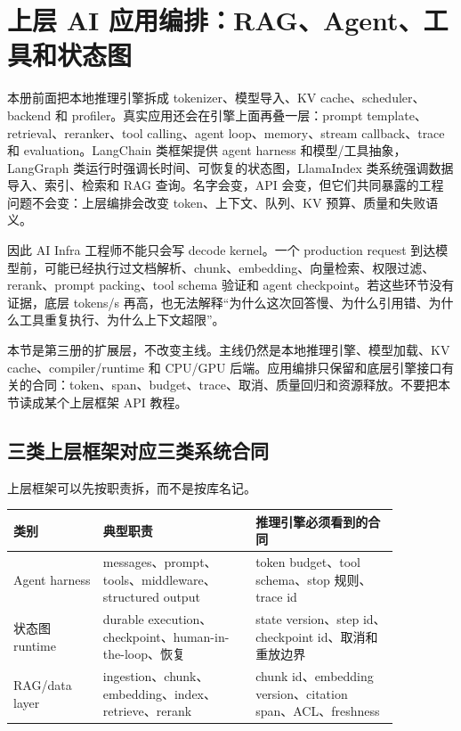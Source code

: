 \section{上层 AI 应用编排：RAG、Agent、工具和状态图}

本册前面把本地推理引擎拆成 tokenizer、模型导入、KV cache、scheduler、backend 和 profiler。真实应用还会在引擎上面再叠一层：prompt template、retrieval、reranker、tool calling、agent loop、memory、stream callback、trace 和 evaluation。LangChain 类框架提供 agent harness 和模型/工具抽象，LangGraph 类运行时强调长时间、可恢复的状态图，LlamaIndex 类系统强调数据导入、索引、检索和 RAG 查询。名字会变，API 会变，但它们共同暴露的工程问题不会变：上层编排会改变 token、上下文、队列、KV 预算、质量和失败语义。

因此 AI Infra 工程师不能只会写 decode kernel。一个 production request 到达模型前，可能已经执行过文档解析、chunk、embedding、向量检索、权限过滤、rerank、prompt packing、tool schema 验证和 agent checkpoint。若这些环节没有证据，底层 tokens/s 再高，也无法解释“为什么这次回答慢、为什么引用错、为什么工具重复执行、为什么上下文超限”。

\begin{warningbox}
本节是第三册的扩展层，不改变主线。主线仍然是本地推理引擎、模型加载、KV cache、compiler/runtime 和 CPU/GPU 后端。应用编排只保留和底层引擎接口有关的合同：token、span、budget、trace、取消、质量回归和资源释放。不要把本节读成某个上层框架 API 教程。
\end{warningbox}

\subsection{三类上层框架对应三类系统合同}

上层框架可以先按职责拆，而不是按库名记。

\begin{center}
\small
\begin{tabular}{p{0.20\linewidth}p{0.34\linewidth}p{0.32\linewidth}}
\toprule
类别 & 典型职责 & 推理引擎必须看到的合同 \\
\midrule
Agent harness & messages、prompt、tools、middleware、structured output & token budget、tool schema、stop 规则、trace id \\
状态图 runtime & durable execution、checkpoint、human-in-the-loop、恢复 & state version、step id、checkpoint id、取消和重放边界 \\
RAG/data layer & ingestion、chunk、embedding、index、retrieve、rerank & chunk id、embedding version、citation span、ACL、freshness \\
\bottomrule
\end{tabular}
\end{center}

